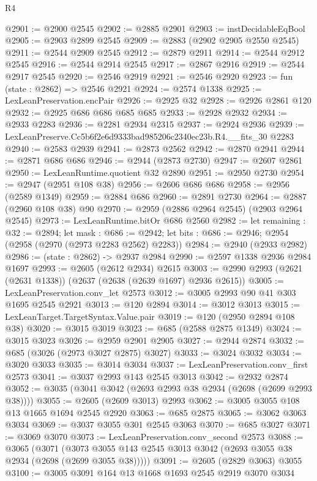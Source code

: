 \begin{lexlean}{R4}
\begin{coremodule}
@2901 := @2900 @2545
@2902 := @2885 @2901
@2903 := instDecidableEqBool
@2905 := @2903 @2899 @2545
@2909 := @2883 (@2902 @2905 @2550 @2545)
@2911 := @2544 @2909 @2545
@2912 := @2879 @2911
@2914 := @2544 @2912 @2545
@2916 := @2544 @2914 @2545
@2917 := @2867 @2916
@2919 := @2544 @2917 @2545
@2920 := @2546 @2919
@2921 := @2546 @2920
@2923 := fun (state : @2862) => @2546 @2921
@2924 := @2574 @1338
@2925 := LexLeanPreservation.encPair
@2926 := @2925 @32
@2928 := @2926 @2861 @120
@2932 := @2925 @686 @686 @685 @685
@2933 := @2928 @2932
@2934 := @2933 @2283
@2936 := @2281 @2934 @2315
@2937 := @2924 @2936
@2939 := LexLeanPreserve.Cc5b6f2e6d9333bad985206c2340ec23b.R4.__fits_30 @2283
@2940 := @2583 @2939
@2941 := @2873 @2562
@2942 := @2870 @2941
@2944 := @2871 @686 @686
@2946 := @2944 (@2873 @2730)
@2947 := @2607 @2861
@2950 := LexLeanRuntime.quotient @32 @2890
@2951 := @2950 @2730
@2954 := @2947 (@2951 @108 @38)
@2956 := @2606 @686 @686
@2958 := @2956 (@2589 @1349)
@2959 := @2884 @686
@2960 := @2891 @2730
@2964 := @2887 (@2960 @108 @38) @90
@2970 := @2959 (@2886 @2964 @2545) (@2903 @2964 @2545)
@2973 := LexLeanRuntime.bitOr @686 @2560
@2982 := let remaining : @32 := @2894;
  let mask : @686 := @2942;
  let bits : @686 := @2946; @2954 (@2958 (@2970 (@2973 @2283 @2562) @2283))
@2984 := @2940 (@2933 @2982)
@2986 := (state : @2862) -> @2937 @2984
@2990 := @2597 @1338 @2936 @2984 @1697
@2993 := @2605 (@2612 @2934) @2615
@3003 := @2990 @2993 (@2621 (@2631 @1338)) (@2637 (@2638 (@2639 @1697) @2936 @2615))
@3005 := LexLeanPreservation.conv_let @2573
@3012 := @3005 @2993 @90 @41 @303 @1695 @2545 @2921
@3013 := @120 @2894
@3014 := @3012 @3013
@3015 := LexLeanTarget.TargetSyntax.Value.pair
@3019 := @120 (@2950 @2894 @108 @38)
@3020 := @3015 @3019
@3023 := @685 (@2588 @2875 @1349)
@3024 := @3015 @3023
@3026 := @2959 @2901 @2905
@3027 := @2944 @2874
@3032 := @685 (@3026 (@2973 @3027 @2875) @3027)
@3033 := @3024 @3032
@3034 := @3020 @3033
@3035 := @3014 @3034
@3037 := LexLeanPreservation.conv_first @2573
@3041 := @3037 @2993 @143 @2545 @3013
@3042 := @2932 @2874
@3052 := @3035 (@3041 @3042 (@2693 @2993 @38 @2934 (@2698 (@2699 @2993 @38))))
@3055 := @2605 (@2609 @3013) @2993
@3062 := @3005 @3055 @108 @13 @1665 @1694 @2545 @2920
@3063 := @685 @2875
@3065 := @3062 @3063 @3034
@3069 := @3037 @3055 @301 @2545 @3063
@3070 := @685 @3027
@3071 := @3069 @3070
@3073 := LexLeanPreservation.conv_second @2573
@3088 := @3065
    (@3071 (@3073 @3055 @143 @2545 @3013 @3042 (@2693 @3055 @38 @2934 (@2698 (@2699 @3055 @38)))))
@3091 := @2605 (@2829 @3063) @3055
@3100 := @3005 @3091 @164 @13 @1668 @1693 @2545 @2919 @3070 @3034

\end{coremodule}
\end{lexlean}
